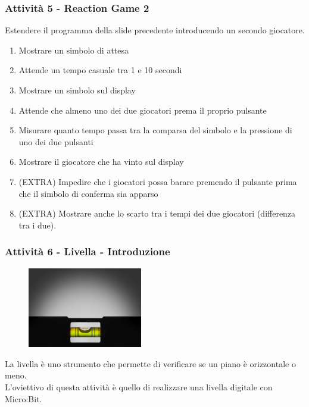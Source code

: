 \documentclass{beamer}
\begin{document}
\begin{frame}
	\frametitle{Attività 5 - Reaction Game 2}
	Estendere il programma della slide precedente introducendo un secondo giocatore.\\
	
	\vspace{0.5em}
	\begin{enumerate}
		\item Mostrare un simbolo di attesa
		\item Attende un tempo casuale tra 1 e 10 secondi
		\item Mostrare un simbolo sul display
		\item Attende che almeno uno dei due giocatori prema il proprio pulsante
		\item Misurare quanto tempo passa tra la comparsa del simbolo e la pressione di uno dei due pulsanti
		\item Mostrare il giocatore che ha vinto sul display
		\item (EXTRA) Impedire che i giocatori possa barare premendo il pulsante prima che il simbolo di conferma sia apparso
		\item (EXTRA) Mostrare anche lo scarto tra i tempi dei due giocatori (differenza tra i due).
	\end{enumerate}	
\end{frame}

\begin{frame}
	\frametitle{Attività 6 - Livella - Introduzione}

	\begin{figure}[h]
		\includegraphics[width=5cm]{level.jpg}
	\end{figure}
	
	La livella è uno strumento che permette di verificare se un piano è orizzontale o meno.\\
	L'oviettivo di questa attività è quello di realizzare una livella digitale con Micro:Bit.

\end{frame}
\end{document}
